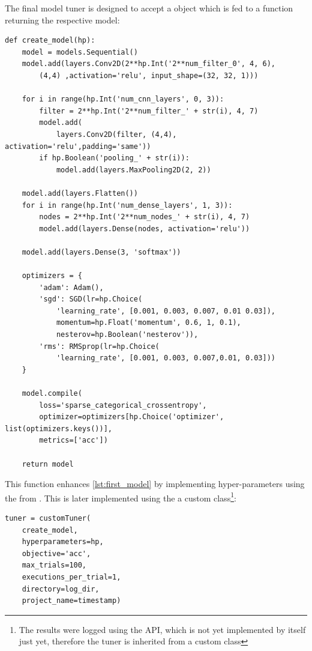 The final model tuner is designed to accept a  object which is fed to a function returning the respective model:

\begin{lstlisting}
def create_model(hp):
    model = models.Sequential()
    model.add(layers.Conv2D(2**hp.Int('2**num_filter_0', 4, 6),
        (4,4) ,activation='relu', input_shape=(32, 32, 1)))

    for i in range(hp.Int('num_cnn_layers', 0, 3)):
        filter = 2**hp.Int('2**num_filter_' + str(i), 4, 7)
        model.add(
            layers.Conv2D(filter, (4,4), activation='relu',padding='same'))
        if hp.Boolean('pooling_' + str(i)):
            model.add(layers.MaxPooling2D(2, 2))

    model.add(layers.Flatten())
    for i in range(hp.Int('num_dense_layers', 1, 3)):
        nodes = 2**hp.Int('2**num_nodes_' + str(i), 4, 7)
        model.add(layers.Dense(nodes, activation='relu'))
    
    model.add(layers.Dense(3, 'softmax'))

    optimizers = {
        'adam': Adam(),
        'sgd': SGD(lr=hp.Choice(
            'learning_rate', [0.001, 0.003, 0.007, 0.01 0.03]),
            momentum=hp.Float('momentum', 0.6, 1, 0.1),
            nesterov=hp.Boolean('nesterov')),
        'rms': RMSprop(lr=hp.Choice(
            'learning_rate', [0.001, 0.003, 0.007,0.01, 0.03]))
    }

    model.compile(
        loss='sparse_categorical_crossentropy',
        optimizer=optimizers[hp.Choice('optimizer', list(optimizers.keys())],
        metrics=['acc'])

    return model
\end{lstlisting}

This function enhances \ref{lst:first_model} by implementing hyper-parameters using the  from .
This is later implemented using the a custom class\footnote{The results were logged using the  API, which is not yet implemented by  itself just yet, therefore the tuner is inherited from a custom class}:

\begin{lstlisting}
tuner = customTuner(
    create_model,
    hyperparameters=hp,
    objective='acc',
    max_trials=100,
    executions_per_trial=1,
    directory=log_dir,
    project_name=timestamp)
\end{lstlisting}

